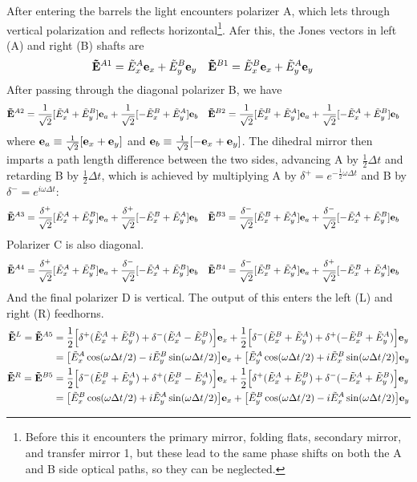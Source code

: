 \documentclass{article}
\newcommand{\rtwo}{\frac{1}{\sqrt{2}}}
\newcommand{\rtd}{\frac{\delta^+}{\sqrt{2}}}
\newcommand{\rtc}{\frac{\delta^-}{\sqrt{2}}}
\newcommand{\J}{{\tilde E}}
\renewcommand{\vec}[1]{{\bf #1}}
\begin{document}
After entering the barrels the light encounters polarizer A, which lets through
vertical polarization and reflects horizontal\footnote{
	Before this it encounters the primary mirror, folding flats, secondary mirror,
	and transfer mirror 1, but these lead to the same phase shifts on both
	the A and B side optical paths, so they can be neglected.}. Afer this,
the Jones vectors in left (A) and right (B) shafts are
\begin{align}
	\vec \J^{A1} &= \J^A_x \vec e_x + \J^B_y \vec e_y &
	\vec \J^{B1} &= \J^B_x \vec e_x + \J^A_y \vec e_y
\end{align}
After passing through the diagonal polarizer B, we have
\begin{align}
	\vec \J^{A2} &= \rtwo [\J^A_x+\J^B_y]\vec e_a + \rtwo[-\J^B_x+\J^A_y]\vec e_b &
	\vec \J^{B2} &= \rtwo [\J^B_x+\J^A_y]\vec e_a + \rtwo[-\J^A_x+\J^B_y]\vec e_b
\end{align}
where $\vec e_a \equiv \rtwo [\vec e_x + \vec e_y]$ and $\vec e_b
\equiv \rtwo [-\vec e_x + \vec e_y]$. The dihedral mirror then
imparts a path length difference between the two sides, advancing
A by $\frac12\Delta t$ and retarding B by $\frac12\Delta t$, which
is achieved by multiplying A by $\delta^+ = e^{-\frac12\omega\Delta t}$
and B by $\delta^- = e^{i\omega\Delta t}$:
\begin{align}
	\vec \J^{A3} &= \rtd [\J^A_x+\J^B_y]\vec e_a + \rtd[-\J^B_x+\J^A_y]\vec e_b &
	\vec \J^{B3} &= \rtc [\J^B_x+\J^A_y]\vec e_a + \rtc[-\J^A_x+\J^B_y]\vec e_b
\end{align}
Polarizer C is also diagonal.
\begin{align}
	\vec \J^{A4} &= \rtd [\J^A_x+\J^B_y]\vec e_a + \rtc [-\J^A_x+\J^B_y]\vec e_b &
	\vec \J^{B4} &= \rtc [\J^B_x+\J^A_y]\vec e_a + \rtd [-\J^B_x+\J^A_y]\vec e_b
\end{align}
And the final polarizer D is vertical. The output of this enters
the left (L) and right (R) feedhorns.
\begin{align}
	\vec \J^L = \vec \J^{A5} &= \frac12 \Big[\delta^+(\J^A_x+\J^B_y)+\delta^-(\J^A_x-\J^B_y)\Big]\vec e_x
		+ \frac12 \Big[\delta^-(\J^B_x+\J^A_y)+\delta^+(-\J^B_x+\J^A_y)\Big]\vec e_y \notag \\
		&= \big[\J^A_x\cos(\omega\Delta t/2) - i\J^B_y\sin(\omega\Delta t/2)\big]\vec e_x
		+  \big[\J^A_y\cos(\omega\Delta t/2) + i\J^B_x\sin(\omega\Delta t/2)\big]\vec e_y \\
	\vec \J^R = \vec \J^{B5} &= \frac12 \Big[\delta^-(\J^B_x+\J^A_y)+\delta^+(\J^B_x-\J^A_y)\Big]\vec e_x
		+ \frac12 \Big[\delta^+(\J^A_x+\J^B_y)+\delta^-(-\J^A_x+\J^B_y)\Big]\vec e_y \notag \\
		&= \big[\J^B_x\cos(\omega\Delta t/2) + i\J^A_y\sin(\omega\Delta t/2)\big]\vec e_x
		+  \big[\J^B_y\cos(\omega\Delta t/2) - i\J^A_x\sin(\omega\Delta t/2)\big]\vec e_y
\end{align}
\end{document}
